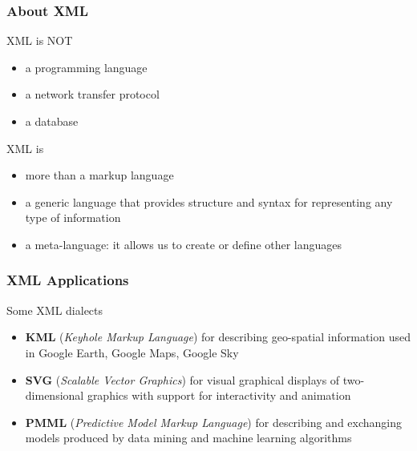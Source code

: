 \documentclass{beamer}\usepackage[]{graphicx}\usepackage[]{color}
\begin{document}

\begin{frame}
\frametitle{About XML}

\begin{block}{XML is NOT}
\begin{itemize}
 \item a programming language
 \item a network transfer protocol
 \item a database
\end{itemize}
\end{block}

\begin{block}{XML is}
\begin{itemize}
 \item more than a markup language
 \item a generic language that provides structure and syntax for representing any type of information
 \item a meta-language: it allows us to create or define other languages
\end{itemize}
\end{block}

\end{frame}


\begin{frame}
\frametitle{XML Applications}

\begin{block}{Some XML dialects}
\begin{itemize}
 \item \textbf{KML} (\textit{Keyhole Markup Language}) for describing geo-spatial information used in Google Earth, Google Maps, Google Sky
 \item \textbf{SVG} (\textit{Scalable Vector Graphics}) for visual graphical displays of two-dimensional graphics with support for interactivity and animation
 \item \textbf{PMML} (\textit{Predictive Model Markup Language}) for describing and exchanging models produced by data mining and machine learning algorithms
\end{itemize}
\end{block}

\end{frame}


\end{document}
